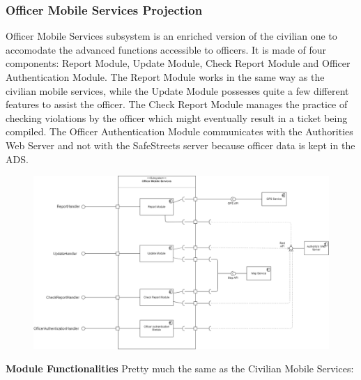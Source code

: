\documentclass[12pt,a4paper]{article}
\begin{document}
\subsubsection{Officer Mobile Services Projection}
Officer Mobile Services subsystem is an enriched version of the civilian one to accomodate the advanced functions accessible to officers. It is made of four components: Report Module, Update Module, Check Report Module and Officer Authentication Module.
The Report Module works in the same way as the civilian mobile services, while the Update Module possesses quite a few different features to assist the officer. The Check Report Module manages the practice of checking violations by the officer
which might eventually result in a ticket being compiled. The Officer Authentication Module communicates with the Authorities Web Server and not with the SafeStreets server because officer data is kept in the ADS. 
\begin{figure}[H]
				\centering
					\begin{adjustwidth}{-25mm}{-25mm}
					        \includegraphics[width=0.9\paperwidth]{Images/OfficerMobileServicesProjection}
					\end{adjustwidth}
			\end{figure}
\textbf{Module Functionalities}
Pretty much the same as the Civilian Mobile Services:
\end{document}
